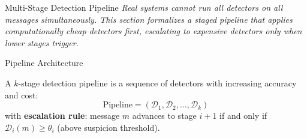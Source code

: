 \documentclass[
  ignorenonframetext,
]{beamer}
\begin{document}
\begin{frame}[allowframebreaks]{Multi-Stage Detection Pipeline}
\emph{Real systems cannot run all detectors on all messages
simultaneously. This section formalizes a staged pipeline that applies
computationally cheap detectors first, escalating to expensive detectors
only when lower stages trigger.}
\end{frame}

\begin{frame}[allowframebreaks]{Pipeline Architecture}
\protect{}\label{pipeline-architecture}
\begin{definition}
\label{def:multi-stage}
A $k$-stage detection pipeline is a sequence of detectors with increasing accuracy and cost:
\begin{equation}
\label{eq:pipeline}
\text{Pipeline} = (\mathcal{D}_1, \mathcal{D}_2, \ldots, \mathcal{D}_k)
\end{equation}
with \textbf{escalation rule}: message $m$ advances to stage $i+1$ if and only if $\mathcal{D}_i(m) \geq \theta_i$ (above suspicion threshold).
\end{definition}

\end{frame}
\end{document}
